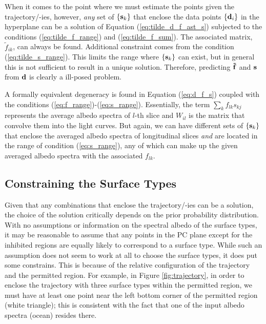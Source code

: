 \documentclass[iop,numberedappendix,apj,]{emulateapj}
\def\fast{\tilde f}
\begin{document}
When it comes to the point where we must estimate the points given the trajectory/-ies, however, {\it any} set of $\{ {\bf s}_k \}$ that enclose the data points $\{{\bf d}_i\}$ in the hyperplane can be a solution of Equation (\ref{eq:tilde_d_f_ast_s}) subjected to the conditions (\ref{eq:tilde_f_range}) and (\ref{eq:tilde_f_sum}). 
The associated matrix, $\fast _{ik}$, can always be found. 
Additional constraint comes from the condition (\ref{eq:tilde_s_range}). This limits the range where $\{ {\bf s}_k \}$ can exist, but in general this is not sufficient to result in a unique solution. 
Therefore, predicting ${\bf \fast }$ and ${\bf s}$ from ${\bf d}$ is clearly a ill-posed problem. 

A formally equivalent degeneracy is found in Equation (\ref{eq:d_f_s}) coupled with the conditions (\ref{eq:f_range})-(\ref{eq:s_range}). 
Essentially, the term $\sum _k f_{lk} s_{kj}$ represents the average albedo spectra of $l$-th slice and $W_{il}$ is the matrix that convolve them into the light curves. 
But again, we can have different sets of $\{ {\bf s}_k \}$ that enclose the averaged albedo spectra of longitudinal slices {\it and} are located in the range of condition (\ref{eq:s_range}), any of which can make up the given averaged albedo spectra with the associated $f_{lk}$. 


\subsection{Constraining the Surface Types}
\label{ss:constraining}

Given that any combinations that enclose the trajectory/-ies can be a solution, the choice of the solution critically depends on the prior probability distribution. 
With no assumptions or information on the spectral albedo of the surface types, it may be reasonable to assume that any points in the PC plane except for the inhibited regions are equally likely to correspond to a surface type. 
While such an assumption does not seem to work at all to choose the surface types, it does put some constrains. 
This is because of the relative configuration of the trajectory and the permitted region. 
For example, in Figure \ref{fig:trajectory}, in order to enclose the trajectory with three surface types within the permitted region, we must have at least one point near the left bottom corner of the permitted region (white triangle); this is consistent with the fact that one of the input albedo spectra (ocean) resides there. 
\end{document}
